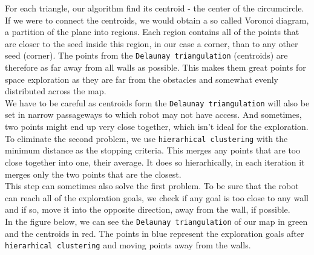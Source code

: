 \documentclass[12pt,a4paper]{article}
\begin{document}
	For each triangle, our algorithm find its centroid - the center of the circumcircle. If we were to connect the centroids, we would obtain a so called Voronoi diagram, a partition of the plane into regions. Each region contains all of the points that are closer to the seed inside this region, in our case a corner, than to any other seed (corner). The points from the \texttt{Delaunay triangulation} (centroids) are therefore as far away from all walls as possible. This makes them great points for space exploration as they are far from the obstacles and somewhat evenly distributed across the map. \\

	We have to be careful as centroids form the \texttt{Delaunay triangulation} will also be set in narrow passageways to which robot may not have access. And sometimes, two points might end up very close together, which isn't ideal for the exploration. \\
	
	To eliminate the second problem, we use \texttt{hierarhical clustering} with the minimum distance as the stopping criteria. This merges any points that are too close together into one, their average. It does so hierarhically, in each iteration it merges only the two points that are the closest. \\
	
	This step can sometimes also solve the first problem. To be sure that the robot can reach all of the exploration goals, we check if any goal is too close to any wall and if so, move it into the opposite direction, away from the wall, if possible. \\

	In the figure below, we can see the \texttt{Delaunay triangulation} of our map in green and the centroids in red. The points in blue represent the exploration goals after \texttt{hierarhical clustering} and moving points away from the walls.
\end{document}
